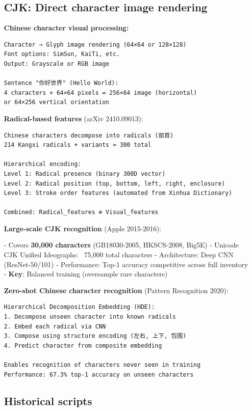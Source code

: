 \documentclass[11pt]{article}
\begin{document}
\subsection{CJK: Direct character image rendering}

\textbf{Chinese character visual processing:}

\begin{verbatim}
Character → Glyph image rendering (64×64 or 128×128)
Font options: SimSun, KaiTi, etc.
Output: Grayscale or RGB image

Sentence "你好世界" (Hello World):
4 characters × 64×64 pixels = 256×64 image (horizontal)
or 64×256 vertical orientation
\end{verbatim}

\textbf{Radical-based features} (arXiv 2410.09013):

\begin{verbatim}
Chinese characters decompose into radicals (部首)
214 Kangxi radicals + variants ≈ 300 total

Hierarchical encoding:
Level 1: Radical presence (binary 300D vector)
Level 2: Radical position (top, bottom, left, right, enclosure)
Level 3: Stroke order features (automated from Xinhua Dictionary)

Combined: Radical_features ⊕ Visual_features
\end{verbatim}

\textbf{Large-scale CJK recognition} (Apple 2015-2016):

- Covers \textbf{30,000 characters} (GB18030-2005, HKSCS-2008, Big5E)
- Unicode CJK Unified Ideographs: ~75,000 total characters
- Architecture: Deep CNN (ResNet-50/101)
- Performance: Top-1 accuracy competitive across full inventory
- \textbf{Key}: Balanced training (oversample rare characters)

\textbf{Zero-shot Chinese character recognition} (Pattern Recognition 2020):

\begin{verbatim}
Hierarchical Decomposition Embedding (HDE):
1. Decompose unseen character into known radicals
2. Embed each radical via CNN
3. Compose using structure encoding (左右, 上下, 包围)
4. Predict character from composite embedding

Enables recognition of characters never seen in training
Performance: 67.3% top-1 accuracy on unseen characters
\end{verbatim}

\subsection{Historical scripts}
\end{document}
